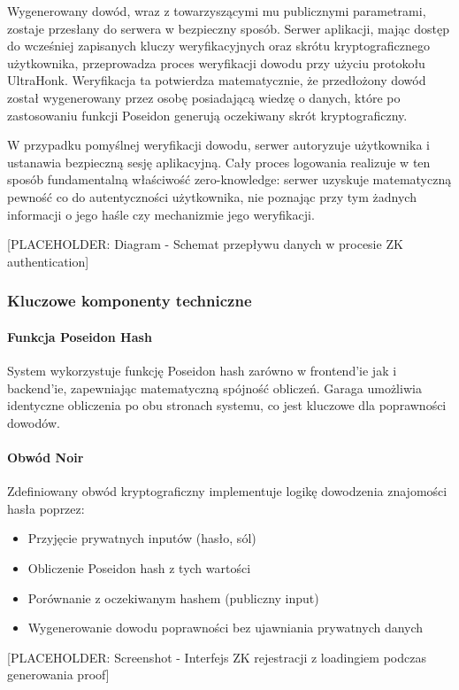 \documentclass{article}
\begin{document}
Wygenerowany dowód, wraz z towarzyszącymi mu publicznymi parametrami, zostaje przesłany do serwera w bezpieczny sposób. Serwer aplikacji, mając dostęp do wcześniej zapisanych kluczy weryfikacyjnych oraz skrótu kryptograficznego użytkownika, przeprowadza proces weryfikacji dowodu przy użyciu protokołu UltraHonk. Weryfikacja ta potwierdza matematycznie, że przedłożony dowód został wygenerowany przez osobę posiadającą wiedzę o danych, które po zastosowaniu funkcji Poseidon generują oczekiwany skrót kryptograficzny.

W przypadku pomyślnej weryfikacji dowodu, serwer autoryzuje użytkownika i ustanawia bezpieczną sesję aplikacyjną. Cały proces logowania realizuje w ten sposób fundamentalną właściwość zero-knowledge: serwer uzyskuje matematyczną pewność co do autentyczności użytkownika, nie poznając przy tym żadnych informacji o jego haśle czy mechanizmie jego weryfikacji.

[PLACEHOLDER: Diagram - Schemat przepływu danych w procesie ZK authentication]

\subsubsection{Kluczowe komponenty techniczne}
\paragraph{Funkcja Poseidon Hash}
System wykorzystuje funkcję Poseidon hash zarówno w frontend'ie jak i backend'ie, zapewniając matematyczną spójność obliczeń. Garaga umożliwia identyczne obliczenia po obu stronach systemu, co jest kluczowe dla poprawności dowodów.

\paragraph{Obwód Noir}
Zdefiniowany obwód kryptograficzny implementuje logikę dowodzenia znajomości hasła poprzez:
\begin{itemize}
    \item Przyjęcie prywatnych inputów (hasło, sól)
    \item Obliczenie Poseidon hash z tych wartości
    \item Porównanie z oczekiwanym hashem (publiczny input)
    \item Wygenerowanie dowodu poprawności bez ujawniania prywatnych danych
\end{itemize}

[PLACEHOLDER: Screenshot - Interfejs ZK rejestracji z loadingiem podczas generowania proof]
\end{document}
